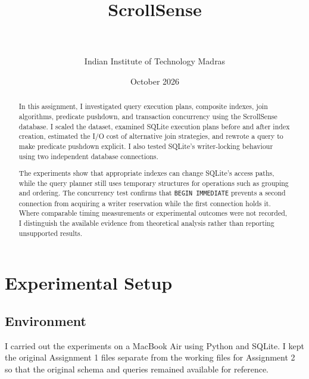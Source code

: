 \documentclass[11pt,a4paper]{article}
\title{
    \textbf{ScrollSense}\\[0.4em]
    \large \assignment
}
\author{
    \studentname\\
    \studentid\\
    Indian Institute of Technology Madras
}
\date{October 2026}
\begin{document}
\maketitle
\thispagestyle{empty}

\vspace{1em}

\begin{abstract}
In this assignment, I investigated query execution plans, composite
indexes, join algorithms, predicate pushdown, and transaction
concurrency using the ScrollSense database. I scaled the dataset,
examined SQLite execution plans before and after index creation,
estimated the I/O cost of alternative join strategies, and rewrote
a query to make predicate pushdown explicit. I also tested SQLite's
writer-locking behaviour using two independent database connections.

The experiments show that appropriate indexes can change SQLite's
access paths, while the query planner still uses temporary structures
for operations such as grouping and ordering. The concurrency test
confirms that \texttt{BEGIN IMMEDIATE} prevents a second connection
from acquiring a writer reservation while the first connection holds
it. Where comparable timing measurements or experimental outcomes
were not recorded, I distinguish the available evidence from
theoretical analysis rather than reporting unsupported results.
\end{abstract}

\newpage
\tableofcontents
\newpage

\section{Experimental Setup}

\subsection{Environment}

I carried out the experiments on a MacBook Air using Python and
SQLite. I kept the original Assignment 1 files separate from the
working files for Assignment 2 so that the original schema and
queries remained available for reference.
\end{document}
